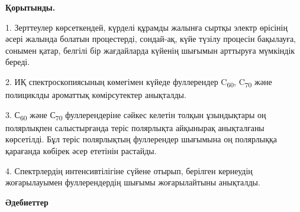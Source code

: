 \begin{multicols}{2}
{\bfseries Қорытынды.}

1. Зерттеулер көрсеткендей, күрделі құрамды жалынға сыртқы электр
өрісінің әсері жалында болатын процестерді, сондай-ақ, күйе түзілу
процесін бақылауға, сонымен қатар, белгілі бір жағдайларда күйенің
шығымын арттыруға мүмкіндік береді.

2. ИҚ спектроскопиясының көмегімен күйеде фуллерендер
C\textsubscript{60}, C\textsubscript{70} және полициклды ароматтық
көмірсутектер анықталды.

3. С\textsubscript{60} және С\textsubscript{70} фуллерендеріне сәйкес
келетін толқын ұзындықтары оң полярлықпен салыстырғанда теріс полярлықта
айқынырақ анықталғаны көрсетілді. Бұл теріс полярлықтың фуллерендер
шығымына оң полярлыққа қарағанда көбірек әсер ететінін растайды.

4. Спектрлердің интенсивтілігіне сүйене отырып, берілген кернеудің
жоғарылауымен фуллерендердің шығымы жоғарылайтыны анықталды.
\end{multicols}

\begin{center}
{\bfseries Әдебиеттер}
\end{center}

